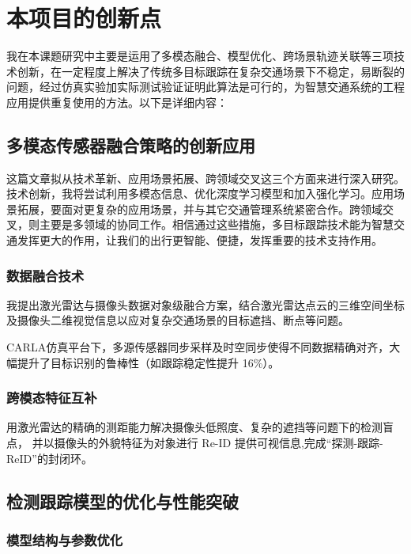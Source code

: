 \chapter{本项目的创新点}

我在本课题研究中主要是运用了多模态融合、模型优化、跨场景轨迹关联等三项技术创新，在一定程度上解决了传统多目标跟踪在复杂交通场景下不稳定，易断裂的问题，经过仿真实验加实际测试验证证明此算法是可行的，为智慧交通系统的工程应用提供重复使用的方法。以下是详细内容：



\section{多模态传感器融合策略的创新应用}

这篇文章拟从技术革新、应用场景拓展、跨领域交叉这三个方面来进行深入研究。技术创新，我将尝试利用多模态信息、优化深度学习模型和加入强化学习。应用场景拓展，要面对更复杂的应用场景，并与其它交通管理系统紧密合作。跨领域交叉，则主要是多领域的协同工作。相信通过这些措施，多目标跟踪技术能为智慧交通发挥更大的作用，让我们的出行更智能、便捷，发挥重要的技术支持作用。


\subsection{数据融合技术}

我提出激光雷达与摄像头数据对象级融合方案，结合激光雷达点云的三维空间坐标及摄像头二维视觉信息以应对复杂交通场景的目标遮挡、断点等问题。

CARLA仿真平台下，多源传感器同步采样及时空同步使得不同数据精确对齐，大幅提升了目标识别的鲁棒性（如跟踪稳定性提升 16\%）。

\subsection{跨模态特征互补}

用激光雷达的精确的测距能力解决摄像头低照度、复杂的遮挡等问题下的检测盲点， 并以摄像头的外貌特征为对象进行 Re-ID 提供可视信息,完成“探测-跟踪-ReID”的封闭环。



\section{检测跟踪模型的优化与性能突破}

\subsection{模型结构与参数优化}

